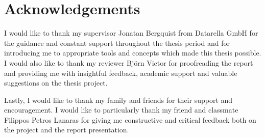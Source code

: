 \chapter*{Acknowledgements}
I would like to thank my supervisor Jonatan Bergquist from Datarella GmbH for
the guidance and constant support throughout the thesis period and for
introducing me to appropriate tools and concepts which made this thesis
possible. I would also like to thank my reviewer Björn Victor for proofreading
the report and providing me with insightful feedback, academic support and
valuable suggestions on the thesis project. 

Lastly, I would like to thank my family and friends for their support and
encouragement. I would like to particularly thank my friend and classmate
Filippos Petros Lanaras for giving me constructive and critical feedback both
on the project and the report presentation. 

